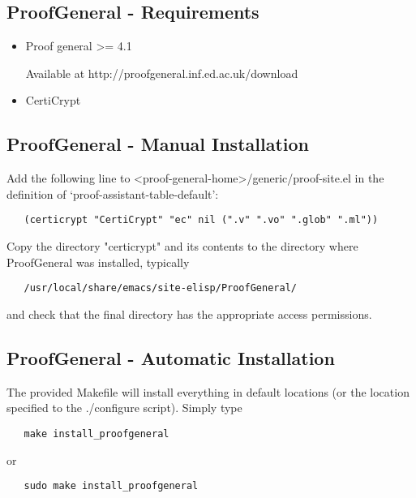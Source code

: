\subsection{ProofGeneral - Requirements}

\begin{itemize}
\item Proof general >=  4.1

  Available at http://proofgeneral.inf.ed.ac.uk/download

\item CertiCrypt

\end{itemize}

\subsection{ProofGeneral - Manual Installation}

Add the following line to <proof-general-home>/generic/proof-site.el
in the definition of `proof-assistant-table-default':

\begin{verbatim}
   (certicrypt "CertiCrypt" "ec" nil (".v" ".vo" ".glob" ".ml"))
\end{verbatim}

Copy the directory "certicrypt" and its contents to the directory
where ProofGeneral was installed, typically

\begin{verbatim}
   /usr/local/share/emacs/site-elisp/ProofGeneral/
\end{verbatim}

and check that the final directory has the appropriate access permissions.

\subsection{ProofGeneral - Automatic Installation}

The provided Makefile will install everything in default
locations (or the location specified to the ./configure script). Simply type

\begin{verbatim}
   make install_proofgeneral
\end{verbatim}

or 

\begin{verbatim}
   sudo make install_proofgeneral
\end{verbatim}

